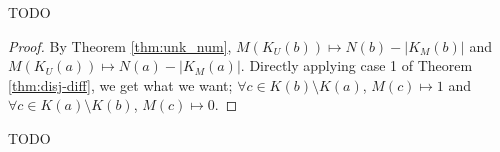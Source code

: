 TODO\\

\begin{proof}
    By Theorem \ref{thm:unk_num}, $M(K_U(b))\mapsto N(b)-|K_M(b)|$ and $M(K_U(a))\mapsto N(a)-|K_M(a)|$. Directly applying case 1 of Theorem \ref{thm:disj-diff}, we get what we want; $\forall c\in K(b)\setminus K(a)$, $M(c)\mapsto 1$ and $\forall c\in K(a)\setminus K(b)$, $M(c)\mapsto 0$.
\end{proof}

TODO\\

